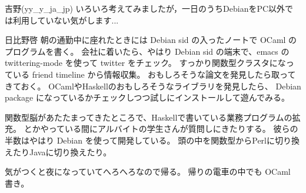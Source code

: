 \begin{prework}{ 吉野(yy\_y\_ja\_jp) }
いろいろ考えてみましたが，一日のうちDebianをPC以外では利用していない気がします...
\end{prework}

\begin{prework}{ 日比野啓 }
朝の通勤中に座れたときには Debian sid の入ったノートで OCaml のプログラムを書く。
会社に着いたら、やはり Debian sid の端末で、emacs の twittering-mode を使って twitter をチェック。
すっかり関数型クラスタになっている friend timeline から情報収集。
おもしろそうな論文を発見したら取ってきておく。
OCamlやHaskellのおもしろそうなライブラリを発見したら、
Debian package になっているかチェックしつつ試しにインストールして遊んでみる。

関数型脳があたたまってきたところで、Haskellで書いている業務プログラムの拡充。
とかやっている間にアルバイトの学生さんが質問しにきたりする。
彼らの半数はやはり Debian を使って開発している。
頭の中を関数型からPerlに切り換えたりJavaに切り換えたり。

気がつくと夜になっていてへろへろなので帰る。
帰りの電車の中でも OCaml 書き。

\end{prework}

